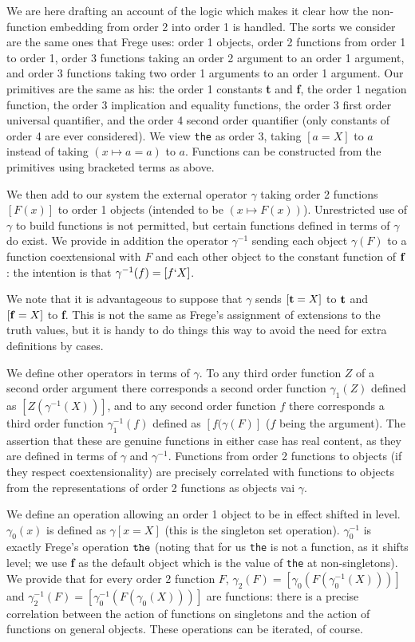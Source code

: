 \documentclass{article}
\begin{document}
{{We are here drafting an account of the logic which makes it clear how the non-function embedding from order 2 into order 1 is handled.  The sorts we consider are the same ones
that Frege uses:  order 1 objects, order 2 functions from order 1 to order 1, order 3 functions taking an order 2 argument to an order 1 argument, and order 3 functions taking
two order 1 arguments to an order 1 argument.  Our primitives are the same as his:  the order 1 constants {\bf t} and {\bf f}, the order 1 negation function, the order 3 implication and equality functions, the order 3 first order universal quantifier, and the order 4 second order quantifier (only constants of order 4 are ever considered).  We view {\tt the} as order 3, taking $[a=X]$ to $a$ instead of taking $(x \mapsto a=a)$ to $a$.  Functions can be constructed from the primitives using bracketed terms as above.

We then add to our system the external operator $\gamma$ taking order 2 functions $[F(x)]$ to order 1 objects (intended to be $(x \mapsto F(x))$).  Unrestricted use of $\gamma$ to build functions is not permitted, but certain functions defined in terms of $\gamma$ do exist.  We provide in addition the operator $\gamma^{-1}$ sending each object $\gamma(F)$ to a function coextensional with $F$ and each other object to the constant function of ${\bf f}$:
the intention is that $\gamma^{-1}(f) = [f`X]$.

We note that it is advantageous to suppose that $\gamma$ sends $[{\bf t}=X]$ to ${\bf t}$ and $[{\bf f}=X]$ to {\bf f}.  This is not the same as Frege's assignment of extensions to the truth values, but it is handy to do things this way to avoid the need for extra definitions by cases.

We define other operators in terms of $\gamma$.  To any third order function $Z$ of a second order argument there corresponds a second order function $\gamma_1(Z)$ defined as $[Z(\gamma^{-1}(X))]$, and to
any second order function $f$ there corresponds a third order function $\gamma_1^{-1}(f)$ defined as $[f(\gamma(F)]$ ($f$ being the argument).  The assertion that these are genuine functions in either case has real content, as they are defined in terms of $\gamma$ and $\gamma^{-1}$.  Functions from order 2 functions to objects (if they respect coextensionality) are precisely correlated with functions to objects from the representations of order 2 functions as objects vai $\gamma$.

We define an operation allowing an order 1 object to be in effect shifted in level.  $\gamma_0(x)$ is defined as $\gamma[x=X]$ (this is the singleton set operation).  $\gamma_0^{-1}$ is exactly Frege's operation ${\tt the}$ (noting that for us {\tt the} is not a function, as it shifts level;  we use {\bf f} as the default object which is the value of {\tt the} at non-singletons).  We provide that for every order 2 function $F$, $\gamma_2(F)=[\gamma_0(F(\gamma_0^{-1}(X)))]$ and  $\gamma_2^{-1}(F)=[\gamma_0^{-1}(F(\gamma_0(X)))]$ are functions:  there is a precise correlation between the action of functions on singletons and the action of functions on general objects.   These operations can be iterated, of course.

}}
\end{document}

